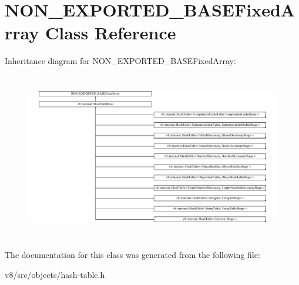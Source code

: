 \hypertarget{classNON__EXPORTED__BASEFixedArray}{}\section{N\+O\+N\+\_\+\+E\+X\+P\+O\+R\+T\+E\+D\+\_\+\+B\+A\+S\+E\+Fixed\+Array Class Reference}
\label{classNON__EXPORTED__BASEFixedArray}
Inheritance diagram for N\+O\+N\+\_\+\+E\+X\+P\+O\+R\+T\+E\+D\+\_\+\+B\+A\+S\+E\+Fixed\+Array\+:\begin{figure}[H]
\begin{center}
\leavevmode
\includegraphics[height=7.353536cm]{classNON__EXPORTED__BASEFixedArray}
\end{center}
\end{figure}


The documentation for this class was generated from the following file\+:\begin{DoxyCompactItemize}
\item 
v8/src/objects/hash-\/table.\+h\end{DoxyCompactItemize}
